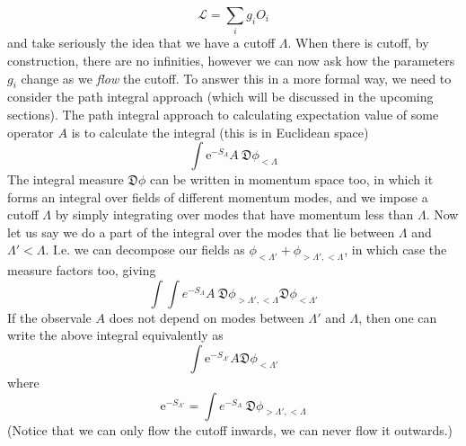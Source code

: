 \documentclass[11pt]{article}
\newcommand{\e}{\mathrm{e}}
\newcommand{\ld}{\mathcal{L}}
\numberwithin{equation}{section}
\begin{document}
\begin{equation*}
    \ld = \sum_ig_iO_i
\end{equation*}
and take seriously the idea that we have a cutoff \(\Lambda\). When there is cutoff, by construction, there are no infinities, however we can now ask how the parameters \(g_i\) change as we \textit{flow} the cutoff. 
To answer this in a more formal way, we need to consider the path integral approach (which will be discussed in the upcoming sections). The path integral approach to calculating expectation value of some operator \(A\) is to calculate the integral (this is in Euclidean space)
\begin{equation*}
    \int \e^{-S_\Lambda}A~\mathfrak{D}\phi_{<\Lambda}
\end{equation*}
The integral measure \(\mathfrak{D}\phi\) can be written in momentum space too, in which it forms an integral over fields of different momentum modes, and we impose a cutoff \(\Lambda\) by simply integrating over modes that have momentum less than \(\Lambda\). Now let us say we do a part of the integral over the modes that lie between \(\Lambda\) and \(\Lambda'<\Lambda\). I.e. we can decompose our fields as \(\phi_{<\Lambda'} + \phi_{>\Lambda', <\Lambda}\), in which case the measure factors too, giving 
\begin{equation*}
    \int \int e^{-S_\Lambda}A ~\mathfrak{D}\phi_{>\Lambda', <\Lambda}\mathfrak{D}\phi_{<\Lambda'} 
\end{equation*}
If the observale \(A\) does not depend on modes between \(\Lambda'\) and \(\Lambda\), then one can write the above integral equivalently as 
\begin{equation*}
    \int \e^{-S_{\Lambda'}}A \mathfrak{D}\phi_{<\Lambda'}
\end{equation*}
where 
\begin{equation*}
    \e^{-S_{\Lambda'}} = \int e^{-S_\Lambda} ~\mathfrak{D}\phi_{>\Lambda', <\Lambda}
\end{equation*}
(Notice that we can only flow the cutoff inwards, we can never flow it outwards.)\\
\end{document}
